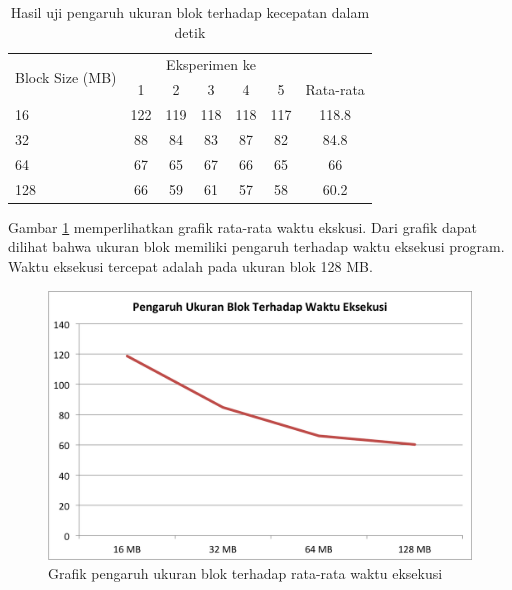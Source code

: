 \begin{table}
	\centering
	\begin{tabular}{| l | c | c | c | c | c | c |}
		\hline
		\multirow{2}{*}{Block Size (MB)} 
		&\multicolumn{5}{c|}{Eksperimen ke }&\\
		\cline{2-6}
			& 1 & 2 & 3 & 4 & 5 & Rata-rata  \\
		\hline
		16 	& 122	& 119	& 118	& 118	& 117  & 118.8 \\
		32		& 88	& 84	& 83	& 87	& 82 & 84.8\\
		64		& 67	& 65	& 67	& 66	& 65 & 66\\
		128	& 66	& 59	& 61	& 57	& 58 & 60.2\\
		\hline
	\end{tabular}	
	\caption{Hasil uji pengaruh ukuran blok terhadap kecepatan dalam detik} \label{tab:waktu_blok}
\end{table}	

Gambar \ref{fig:eks_block_size} memperlihatkan grafik rata-rata waktu ekskusi. Dari grafik dapat dilihat bahwa ukuran blok memiliki pengaruh terhadap waktu eksekusi program. Waktu eksekusi tercepat adalah pada ukuran blok 128 MB.

\begin{figure}[H]
	\centering
	\includegraphics[scale=0.5]{Gambar/eks-block-size.png}
	\caption[Grafik pengaruh ukuran blok terhadap rata-rata waktu eksekusi]{Grafik pengaruh ukuran blok terhadap rata-rata waktu eksekusi} 
	\label{fig:eks_block_size}
\end{figure}

